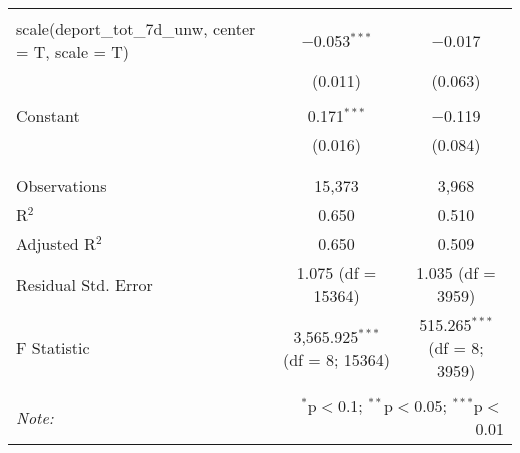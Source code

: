 \begin{table}[!htbp]
\begin{tabular}{@{\extracolsep{5pt}}lcc}
  & & \\ 
 scale(deport\_tot\_7d\_unw, center = T, scale = T) & $-$0.053$^{***}$ & $-$0.017 \\ 
  & (0.011) & (0.063) \\ 
  & & \\ 
 Constant & 0.171$^{***}$ & $-$0.119 \\ 
  & (0.016) & (0.084) \\ 
  & & \\ 
\hline \\[-1.8ex] 
Observations & 15,373 & 3,968 \\ 
R$^{2}$ & 0.650 & 0.510 \\ 
Adjusted R$^{2}$ & 0.650 & 0.509 \\ 
Residual Std. Error & 1.075 (df = 15364) & 1.035 (df = 3959) \\ 
F Statistic & 3,565.925$^{***}$ (df = 8; 15364) & 515.265$^{***}$ (df = 8; 3959) \\ 
\hline 
\hline \\[-1.8ex] 
\textit{Note:}  & \multicolumn{2}{r}{$^{*}$p$<$0.1; $^{**}$p$<$0.05; $^{***}$p$<$0.01} \\ 
\end{tabular} 
\end{table} 
